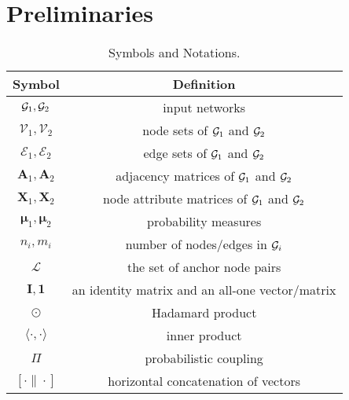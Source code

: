 \vspace{-5pt}
\section{Preliminaries}\label{sec:pre}

\begin{table}[t]
\setlength{\belowcaptionskip}{-.2\baselineskip}
  \caption{Symbols and Notations.}
  \vspace{-10pt}
  \label{tab:sym}
  \begin{tabular}{@{}cc@{}}
    \toprule
    Symbol &Definition\\
    \midrule
    $\mathcal{G}_1,\mathcal{G}_2$ &input networks\\
    $\mathcal{V}_1, \mathcal{V}_2$ & node sets of $\mathcal{G}_1$ and $\mathcal{G}_2$ \\
    $\mathcal{E}_1, \mathcal{E}_2$ & edge sets of $\mathcal{G}_1$ and $\mathcal{G}_2$ \\
    $\mathbf{A}_1,\mathbf{A}_2$ &adjacency matrices of $\mathcal{G}_1$ and $\mathcal{G}_2$\\
    $\mathbf{X}_1,\mathbf{X}_2$ &node attribute matrices of $\mathcal{G}_1$ and $\mathcal{G}_2$\\
    $\bm{\mu}_1,\bm{\mu}_2$ &probability measures \\
    $n_i,m_i$ & number of nodes/edges in $\mathcal{G}_i$\\
    $\mathcal{L}$ &the set of anchor node pairs\\
    \midrule
    $\mathbf{I},\mathbf{1}$ &an identity matrix and an all-one vector/matrix\\
    $\odot$ &Hadamard product\\
    $\langle\cdot,\cdot\rangle$ &inner product\\
    $\Pi$ &probabilistic coupling\\
    $[\cdot\|\cdot]$ & horizontal concatenation of vectors\\
    \bottomrule
  \end{tabular}
  \vspace{-10pt}
\end{table}


